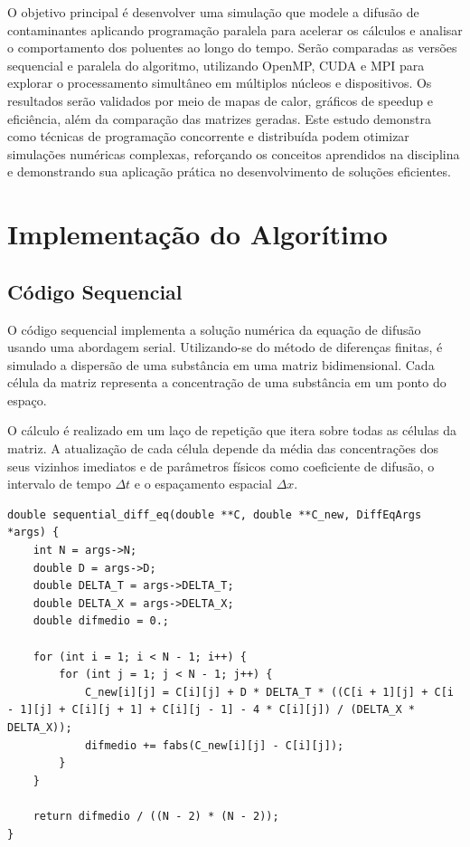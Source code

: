 \documentclass[12pt]{article}
\begin{document}
O objetivo principal é desenvolver uma simulação que modele a difusão de
contaminantes aplicando programação paralela para acelerar os cálculos e
analisar o comportamento dos poluentes ao longo do tempo. Serão comparadas as
versões sequencial e paralela do algoritmo, utilizando OpenMP, CUDA e MPI para
explorar o processamento simultâneo em múltiplos núcleos e dispositivos. Os
resultados serão validados por meio de mapas de calor, gráficos de speedup e
eficiência, além da comparação das matrizes geradas. Este estudo demonstra como
técnicas de programação concorrente e distribuída podem otimizar simulações
numéricas complexas, reforçando os conceitos aprendidos na disciplina e
demonstrando sua aplicação prática no desenvolvimento de soluções eficientes.

\section{Implementação do Algorítimo}

\subsection{Código Sequencial}

O código sequencial implementa a solução numérica da equação de difusão usando
uma abordagem serial. Utilizando-se do método de diferenças finitas, é simulado
a dispersão de uma substância em uma matriz bidimensional. Cada célula da
matriz representa a concentração de uma substância em um ponto do espaço.

O cálculo é realizado em um laço de repetição que itera sobre todas as células
da matriz. A atualização de cada célula depende da média das concentrações dos
seus vizinhos imediatos e de parâmetros físicos como coeficiente de difusão, o
intervalo de tempo $\Delta t$ e o espaçamento espacial $\Delta x$.

\begin{lstlisting}[style=CStyle, caption={Código sequencial para cálculo da difusão, que será utilizado como base para as demais implementações.}, label={cod:seq}]
double sequential_diff_eq(double **C, double **C_new, DiffEqArgs *args) {
    int N = args->N;
    double D = args->D;
    double DELTA_T = args->DELTA_T;
    double DELTA_X = args->DELTA_X;
    double difmedio = 0.;

    for (int i = 1; i < N - 1; i++) {
        for (int j = 1; j < N - 1; j++) {
            C_new[i][j] = C[i][j] + D * DELTA_T * ((C[i + 1][j] + C[i - 1][j] + C[i][j + 1] + C[i][j - 1] - 4 * C[i][j]) / (DELTA_X * DELTA_X));
            difmedio += fabs(C_new[i][j] - C[i][j]);
        }
    }

    return difmedio / ((N - 2) * (N - 2));
}
\end{lstlisting}
\end{document}
